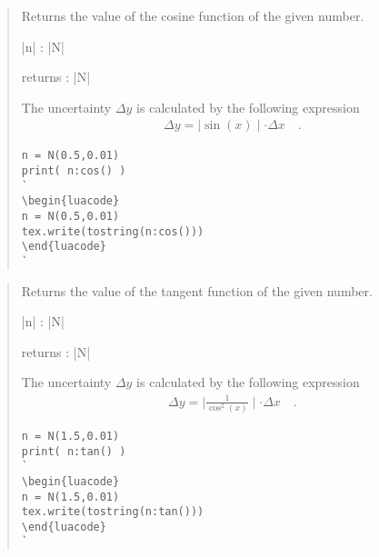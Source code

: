 \documentclass{ltxdoc}
\begin{document}
\begin{quote}
  Returns the value of the cosine function of the given number.

  \begin{description}
  \item |n| : |N|

  \item returns : |N|
  \end{description}

  The uncertainty $\Delta y$ is calculated by the following expression
  \begin{align*}
    \Delta y = \mid \sin(x) \mid \cdot \Delta x \quad.
  \end{align*}


\begin{lstlisting}
n = N(0.5,0.01)
print( n:cos() )
`
\begin{luacode}
n = N(0.5,0.01)
tex.write(tostring(n:cos()))
\end{luacode}
`
\end{lstlisting}

\end{quote}


\begin{quote}
  Returns the value of the tangent function of the given number.

  \begin{description}
  \item |n| : |N|

  \item returns : |N|
  \end{description}

  The uncertainty $\Delta y$ is calculated by the following expression
  \begin{align*}
    \Delta y = \mid \frac{1}{\cos^2(x)} \mid \cdot \Delta x \quad.
  \end{align*}


\begin{lstlisting}
n = N(1.5,0.01)
print( n:tan() )
`
\begin{luacode}
n = N(1.5,0.01)
tex.write(tostring(n:tan()))
\end{luacode}
`
\end{lstlisting}

\end{quote}
\end{document}
